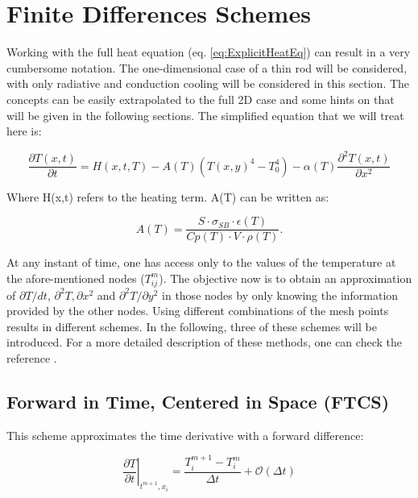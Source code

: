 \section{Finite Differences Schemes}
\label{sec:FD}

Working with the full heat equation (eq. \ref{eq:ExplicitHeatEq}) can result in a very cumbersome notation. 
The one-dimensional case of a thin rod will be considered, with only radiative and conduction cooling will be considered in this section. The concepts can be easily extrapolated to the full 2D case and some hints on that will be given in the following sections.  The simplified equation that we will treat here is: 

\begin{equation}
    \frac{\partial T(x,t)}{\partial t} = 
        H(x,t,T)
        - A(T) \left(T(x,y)^4 - T_0^4\right)
            -\alpha (T)  \frac{\partial^2 T(x,t)}{\partial x^2}   
            \label{eq:SimpleHeating}
    \end{equation}

Where H(x,t) refers to the heating term. A(T) can be written as: 

\begin{equation}
    A(T) = \frac{S\cdot \sigma_{SB}\cdot \epsilon(T)}{Cp(T)\cdot V \cdot \rho(T)}. 
\end{equation}

At any instant of time, one has access only to the values of the temperature at the afore-mentioned nodes ($T^{m}_{ij}$). The objective now is to obtain an approximation of $\partial T/dt$, $\partial^2 T,\partial x^2$ and $\partial^2 T/\partial y^2$ in those nodes by only knowing the information provided by the other nodes. Using different combinations of the mesh points results in different schemes. In the following, three of these schemes will be introduced. For a more detailed description of these methods, one can check the reference \parencite[][]{ref:FiniteDifference}.

\subsection{Forward in Time, Centered in Space (FTCS)}

This scheme approximates the time derivative with a forward difference: 

\begin{equation}
    \left. \frac{\partial T}{\partial t}\right|_{t^{m+1},x_i}  = \frac{T^{m+1}_i - T^m_i}{\Delta t} +  \mathcal{O} \left( \Delta t \right)
 \end{equation}

